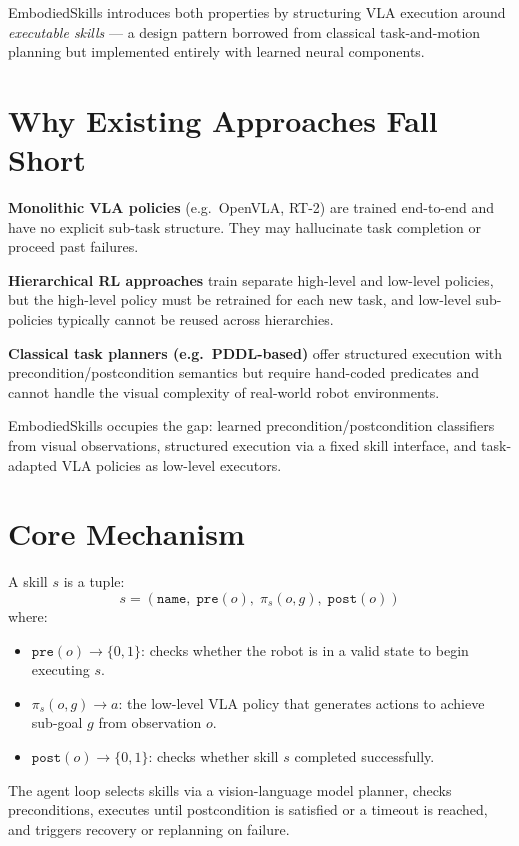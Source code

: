 \documentclass[10pt,twocolumn]{article}
\begin{document}
EmbodiedSkills introduces both properties by structuring VLA execution
around \emph{executable skills} --- a design pattern borrowed from
classical task-and-motion planning but implemented entirely with learned
neural components.

\section{Why Existing Approaches Fall Short}

\textbf{Monolithic VLA policies} (e.g.\ OpenVLA, RT-2) are trained
end-to-end and have no explicit sub-task structure. They may hallucinate
task completion or proceed past failures.

\textbf{Hierarchical RL approaches} train separate high-level and
low-level policies, but the high-level policy must be retrained for
each new task, and low-level sub-policies typically cannot be reused
across hierarchies.

\textbf{Classical task planners (e.g.\ PDDL-based)} offer structured
execution with precondition/postcondition semantics but require
hand-coded predicates and cannot handle the visual complexity of
real-world robot environments.

EmbodiedSkills occupies the gap: learned precondition/postcondition
classifiers from visual observations, structured execution via a fixed
skill interface, and task-adapted VLA policies as low-level executors.

\section{Core Mechanism}

A skill $s$ is a tuple:
\[
  s = (\texttt{name},\; \texttt{pre}(o),\; \pi_s(o, g),\; \texttt{post}(o))
\]
where:
\begin{itemize}[itemsep=1pt,parsep=0pt]
  \item $\texttt{pre}(o) \to \{0,1\}$: checks whether the robot is in
    a valid state to begin executing $s$.
  \item $\pi_s(o, g) \to a$: the low-level VLA policy that generates
    actions to achieve sub-goal $g$ from observation $o$.
  \item $\texttt{post}(o) \to \{0,1\}$: checks whether skill $s$
    completed successfully.
\end{itemize}

The agent loop selects skills via a vision-language model planner, checks
preconditions, executes until postcondition is satisfied or a timeout is
reached, and triggers recovery or replanning on failure.
\end{document}
